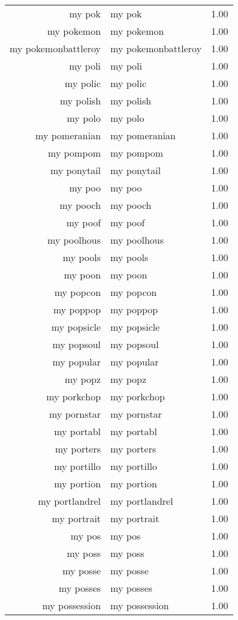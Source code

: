 \begin{table}[ht]
\begin{tabular}{rlr}
  my pok & my pok & 1.00 \\ 
  my pokemon & my pokemon & 1.00 \\ 
  my pokemonbattleroy & my pokemonbattleroy & 1.00 \\ 
  my poli & my poli & 1.00 \\ 
  my polic & my polic & 1.00 \\ 
  my polish & my polish & 1.00 \\ 
  my polo & my polo & 1.00 \\ 
  my pomeranian & my pomeranian & 1.00 \\ 
  my pompom & my pompom & 1.00 \\ 
  my ponytail & my ponytail & 1.00 \\ 
  my poo & my poo & 1.00 \\ 
  my pooch & my pooch & 1.00 \\ 
  my poof & my poof & 1.00 \\ 
  my poolhous & my poolhous & 1.00 \\ 
  my pools & my pools & 1.00 \\ 
  my poon & my poon & 1.00 \\ 
  my popcon & my popcon & 1.00 \\ 
  my poppop & my poppop & 1.00 \\ 
  my popsicle & my popsicle & 1.00 \\ 
  my popsoul & my popsoul & 1.00 \\ 
  my popular & my popular & 1.00 \\ 
  my popz & my popz & 1.00 \\ 
  my porkchop & my porkchop & 1.00 \\ 
  my pornstar & my pornstar & 1.00 \\ 
  my portabl & my portabl & 1.00 \\ 
  my porters & my porters & 1.00 \\ 
  my portillo & my portillo & 1.00 \\ 
  my portion & my portion & 1.00 \\ 
  my portlandrel & my portlandrel & 1.00 \\ 
  my portrait & my portrait & 1.00 \\ 
  my pos & my pos & 1.00 \\ 
  my poss & my poss & 1.00 \\ 
  my posse & my posse & 1.00 \\ 
  my posses & my posses & 1.00 \\ 
  my possession & my possession & 1.00 \\ 

\end{tabular}
\end{table}
